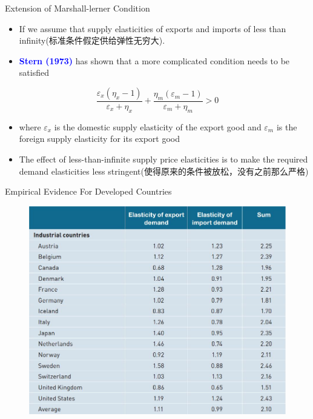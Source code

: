 \documentclass[10pt,hyperref={CJKbookmarks=true},xcolor=dvipsnames,aspectratio=169]{beamer}
\begin{document}
\begin{frame}{Extension of Marshall-lerner Condition}

\begin{itemize}
\item If we assume that supply elasticities of exports and imports of less
than infinity(标准条件假定供给弹性无穷大).
\item \textbf{\textcolor{blue}{Stern (1973)}} has shown that a more complicated
condition needs to be satisfied
\end{itemize}

\[
\frac{\varepsilon_{x}(\eta_{x}-1)}{\varepsilon_{x}+\eta_{x}}+\frac{\eta_{m}(\varepsilon_{m}-1)}{\varepsilon_{m}+\eta_{m}}>0
\]

\begin{itemize}
\item where $\varepsilon_{x}$ is the domestic supply elasticity of the
export good and $\varepsilon_{m}$ is the foreign supply elasticity
for its export good
\item The effect of less-than-infinite supply price elasticities is to make
the required demand elasticities less stringent(使得原来的条件被放松，没有之前那么严格)
\end{itemize}
\end{frame}

\begin{frame}{Empirical Evidence For Developed Countries}


\begin{figure}


\includegraphics[scale=0.35]{fig/boptheory/lec08-12.JPG}

\end{figure}

\end{frame}
\end{document}
